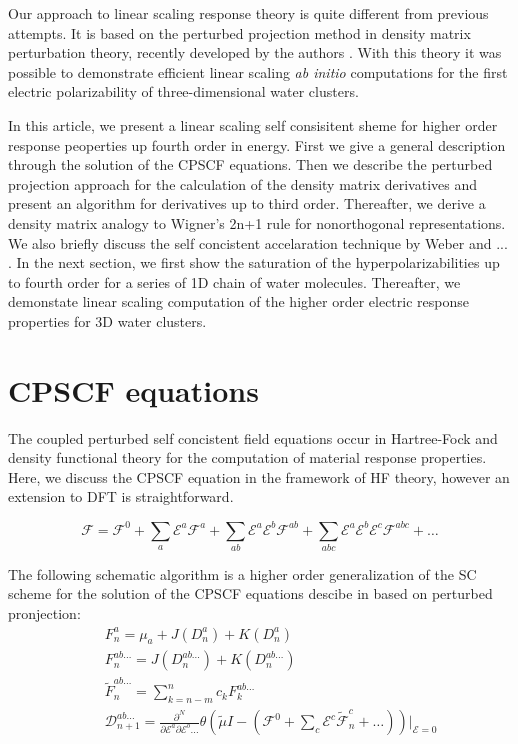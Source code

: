 \documentclass[twocolumn,showpacs,preprintnumbers,amsmath,amssymb]{revtex4}
\begin{document}
 Our approach to linear scaling response theory is quite different 
 from previous attempts. It is based on the perturbed projection
 method in density matrix perturbation theory, recently developed
 by the authors \cite{Niklasson04,Weber04}. With this theory it
 was possible to demonstrate efficient linear scaling {\em ab initio}
 computations for the first electric polarizability of three-dimensional 
 water clusters.

 In this article, we present a linear scaling self consisitent sheme
 for higher order response peoperties up fourth order in energy.
 First we give a general description through the solution of the CPSCF equations.
 Then we describe the perturbed projection approach for the calculation
 of the density matrix derivatives and present
 an algorithm for derivatives up to third order.
 Thereafter, we derive a density matrix analogy to Wigner's 2n+1
 rule for nonorthogonal representations. We also briefly discuss the
 self concistent accelaration technique by Weber and ... . In the next section,
 we first show the saturation of the hyperpolarizabilities up to fourth order
 for a series of 1D chain of water molecules. Thereafter, we demonstate
 linear scaling computation of the higher order electric response properties
 for 3D water clusters.



\section{CPSCF equations}
The coupled perturbed self concistent field equations occur in Hartree-Fock
and density functional theory for the computation of material response
properties. Here, we discuss the CPSCF equation in the framework of
HF theory, however an extension to DFT is straightforward.

\begin{equation}
  \mathcal{F}=\mathcal{F}^{0}+\sum_a \mathcal{E}^{a}\mathcal{F}^{a}+
  \sum_{ab} \mathcal{E}^{a}\mathcal{E}^{b}\mathcal{F}^{ab}+
  \sum_{abc} \mathcal{E}^{a}\mathcal{E}^{b}\mathcal{E}^{c}\mathcal{F}^{abc}+\dots
\end{equation}

The following schematic algorithm is a higher order generalization of the
SC scheme for the solution of the CPSCF equations descibe in \cite{SV} 
based on perturbed pronjection:
\begin{subequations}
\begin{eqnarray}
&&  F^{a}_{n}=\mu_a+J(D^{a}_n)+K(D^{a}_n) \label{FockBuild} \\
&&  F^{ab\ldots}_{n}=J(D^{ab\ldots}_n)+K(D^{ab\ldots}_n) \label{FockBuild} \\
&& \displaystyle\widetilde{F}^{ab\ldots}_{n}=\sum_{k=n-m}^{n}c_k F^{ab\ldots}_{k} \label{DDIIS} \\
&& \displaystyle\mathcal{D}^{ab\ldots}_{n+1}=
  \frac{\partial^N}{\partial\mathcal{E}^a \partial\mathcal{E}^b\ldots}
     \theta(\tilde{\mu}I-(\mathcal{F}^{0}
     +\sum_c\mathcal{E}^{c}\widetilde{\mathcal{F}}^{c}_n
     +\ldots))
     \bigg|_{\mathcal{E}=0} \label{DDeriv}
\end{eqnarray} 
\end{subequations}
\end{document}
